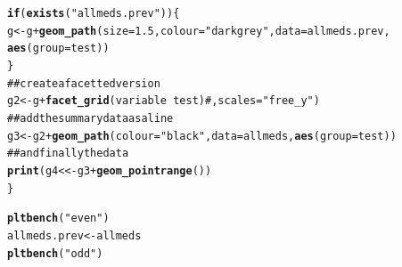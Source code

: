 \documentclass[12pt]{article}\usepackage{graphicx, color}
\makeatletter
\newcommand{\hlfunctioncall}[1]{\textcolor[rgb]{0.501960784313725,0,0.329411764705882}{\textbf{#1}}}%
\newcommand{\hlstring}[1]{\textcolor[rgb]{0.6,0.6,1}{#1}}%
\newcommand{\hlcomment}[1]{\textcolor[rgb]{0.180392156862745,0.6,0.341176470588235}{#1}}%
\newenvironment{kframe}{%
 \def\at@end@of@kframe{}%
 \ifinner\ifhmode%
  \def\at@end@of@kframe{\end{minipage}}%
  \begin{minipage}{\columnwidth}%
 \fi\fi%
 \def\FrameCommand##1{\hskip\@totalleftmargin \hskip-\fboxsep
 \colorbox{shadecolor}{##1}\hskip-\fboxsep
     \hskip-\linewidth \hskip-\@totalleftmargin \hskip\columnwidth}%
 \MakeFramed {\advance\hsize-\width
   \@totalleftmargin\z@ \linewidth\hsize
   \@setminipage}}%
 {\par\unskip\endMakeFramed%
 \at@end@of@kframe}
\newenvironment{knitrout}{}{} %
\makeatother
\begin{document}
\begin{knitrout}
\begin{kframe}
\begin{alltt}
  \hlfunctioncall{if} (\hlfunctioncall{exists}(\hlstring{"allmeds.prev"}))\{
     g <- g + \hlfunctioncall{geom_path}(size=1.5, colour=\hlstring{"dark grey"}, data=allmeds.prev, 
                        \hlfunctioncall{aes}(group=test))
                        \}
\hlcomment{  ## create a facetted version}
  g2 <- g + \hlfunctioncall{facet_grid}(variable~test) #, scales=\hlstring{"free_y"})
\hlcomment{  ## add the summary data as a line}
  g3 <- g2 + \hlfunctioncall{geom_path}(colour=\hlstring{"black"}, data=allmeds, \hlfunctioncall{aes}(group=test))
\hlcomment{  ## and finally the data}
  \hlfunctioncall{print}(g4 <<- g3 + \hlfunctioncall{geom_pointrange}())
\}
\end{alltt}
\end{kframe}
\end{knitrout}


\begin{knitrout}
\color{fgcolor}\begin{kframe}
\begin{alltt}
\hlfunctioncall{pltbench}(\hlstring{"even"})
allmeds.prev <- allmeds
\hlfunctioncall{pltbench}(\hlstring{"odd"})
\end{alltt}
\end{kframe}
\end{knitrout}
\end{document}
